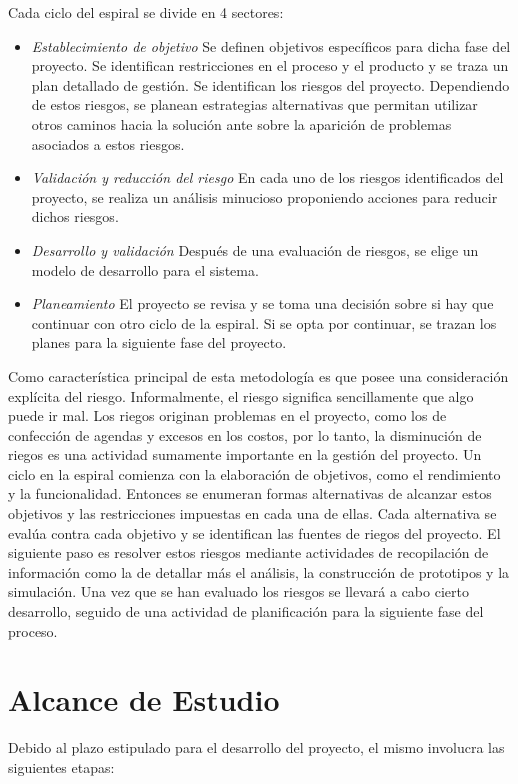 Cada ciclo del espiral se divide en 4 sectores:
\begin {itemize}
\item 
\textit{Establecimiento de objetivo} Se definen objetivos específicos para dicha fase del proyecto. Se identifican restricciones en el proceso y el
producto y se traza un plan detallado de gestión. Se identifican los riesgos del proyecto. Dependiendo de estos riesgos, se planean estrategias
alternativas que permitan utilizar otros caminos hacia la solución ante sobre la aparición de problemas asociados a estos riesgos.
\item 
\textit{Validación y reducción del riesgo} En cada uno de los riesgos identificados del proyecto, se realiza un análisis minucioso proponiendo
acciones para reducir dichos riesgos.
\item 
\textit{Desarrollo y validación} Después de una evaluación de riesgos, se elige un modelo de desarrollo para el sistema.
\item 
\textit{Planeamiento}  El proyecto se revisa y se toma una decisión sobre si hay que continuar con otro ciclo de la espiral. Si se opta por continuar,
se trazan los planes para la siguiente fase del proyecto.
\end {itemize}

Como característica principal de esta metodología es que posee una consideración explícita del riesgo. Informalmente, el riesgo significa
sencillamente que algo puede ir mal. Los riegos originan problemas en el proyecto, como los de confección de agendas y excesos en los costos, por lo
tanto, la disminución de riegos es una actividad sumamente importante en la gestión del proyecto. Un ciclo en la espiral comienza con la elaboración
de objetivos, como el rendimiento y la funcionalidad. Entonces se enumeran formas alternativas de alcanzar estos objetivos y las restricciones
impuestas en cada una de ellas. Cada alternativa se evalúa contra cada objetivo y se identifican las fuentes de riegos del proyecto. El siguiente
paso es resolver estos riesgos mediante actividades de recopilación de información como la de detallar más el análisis, la construcción de prototipos
y la simulación. Una vez que se han evaluado los riesgos se llevará a cabo cierto desarrollo, seguido de una actividad de planificación para la
siguiente fase del proceso.

\section{Alcance de Estudio}
Debido al plazo estipulado para el desarrollo del proyecto, el mismo involucra las siguientes etapas: 

